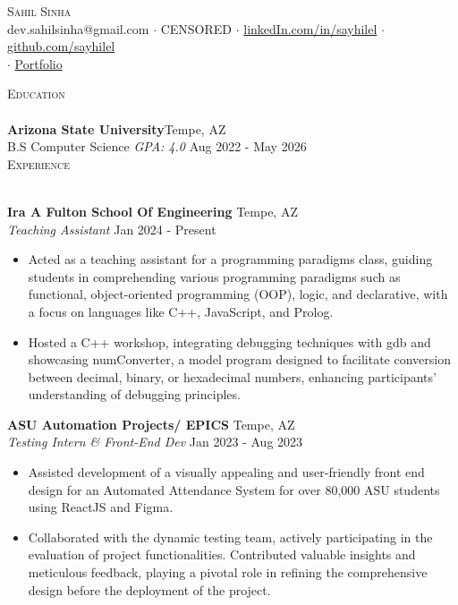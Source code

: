 \documentclass[a4paper]{article}
\newcommand{\lineunder} {
    \vspace*{-8pt} \\
    \hspace*{-18pt} \hrulefill \\
}
\newcommand{\header} [1] {
    {\hspace*{-18pt}\vspace*{6pt} \textsc{#1}}
    \vspace*{-6pt} \lineunder
}
\begin{document}
\vspace*{-40pt}

    

\vspace*{-10pt}
\begin{center}
	{\Huge \scshape {Sahil Sinha}}\\
	  dev.sahilsinha@gmail.com $\cdot$ CENSORED $\cdot$ \href{https://www.linkedin.com/in/sayhilel/}{linkedIn.com/in/sayhilel} $\cdot$ \href{https://github.com/sayhilel}{github.com/sayhilel}\\ $\cdot$ \href{https://sayhilel.com/}{Portfolio}\\
\end{center}

\header{Education}
\textbf{Arizona State University}\hfill Tempe, AZ\\
B.S Computer Science \textit{GPA: 4.0} \hfill Aug 2022 - May 2026\\

\header{Experience}
\vspace{1mm}

\textbf{Ira A Fulton School Of Engineering} \hfill Tempe, AZ\\
\textit{Teaching Assistant} \hfill Jan 2024 - Present\\
\begin{itemize} [label=\tiny$\bullet$]\itemsep 0.005pt
\item Acted as a teaching assistant for a programming paradigms class, guiding students in comprehending various programming paradigms such as functional, object-oriented programming (OOP), logic, and declarative, with a focus on languages like C++, JavaScript, and Prolog.
\item 
Hosted a C++ workshop, integrating debugging techniques with gdb and showcasing numConverter, a model program designed to facilitate conversion between decimal, binary, or hexadecimal numbers, enhancing participants' understanding of debugging principles.
\end{itemize}

\textbf{ASU Automation Projects/ EPICS} \hfill Tempe, AZ\\
\textit{Testing Intern \& Front-End Dev} \hfill Jan 2023 - Aug 2023\\
\vspace{1mm}
\begin{itemize} [label=\tiny$\bullet$]\itemsep 0.005pt
\item 
Assisted development of a visually appealing and user-friendly front end design for an Automated Attendance System for over 80,000 ASU students using ReactJS and Figma.	
	\item Collaborated with the dynamic testing team, actively participating in the evaluation of project functionalities. Contributed valuable insights and meticulous feedback, playing a pivotal role in refining the comprehensive design before the deployment of the project.
\end{itemize}
\end{document}
